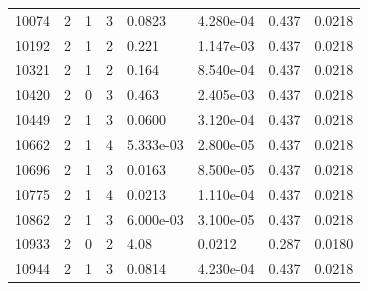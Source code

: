 \documentclass[preview]{standalone}
\begin{document}
{{{\begin{tabular}{L{1.2cm}C{1.2cm} C{0.3cm}C{0.5cm} C{1.4cm}C{1.4cm} C{1.4cm}C{1.4cm}}
  10074  &     2  & 1     &  3 &  0.0823  & 4.280e-04  & 0.437 &  0.0218   \\ 
  10192  &     2  & 1     &  2 &  0.221  & 1.147e-03  & 0.437 &  0.0218   \\ 
  10321  &     2  & 1     &  2 &  0.164  & 8.540e-04  & 0.437 &  0.0218   \\ 
  10420  &     2  & 0     &  3 &  0.463  & 2.405e-03  & 0.437 &  0.0218   \\ 
  10449  &     2  & 1     &  3 &  0.0600  & 3.120e-04  & 0.437 &  0.0218   \\ 
  10662  &     2  & 1     &  4 &  5.333e-03  & 2.800e-05  & 0.437 &  0.0218   \\ 
  10696  &     2  & 1     &  3 &  0.0163  & 8.500e-05  & 0.437 &  0.0218   \\ 
  10775  &     2  & 1     &  4 &  0.0213  & 1.110e-04  & 0.437 &  0.0218   \\ 
  10862  &     2  & 1     &  3 &  6.000e-03  & 3.100e-05  & 0.437 &  0.0218   \\ 
  10933  &     2  & 0     &  2 &  4.08  & 0.0212  & 0.287 &  0.0180   \\ 
  10944  &     2  & 1     &  3 &  0.0814  & 4.230e-04  & 0.437 &  0.0218   \\ 
\hline 
\end{tabular} 

}}}
\end{document}

